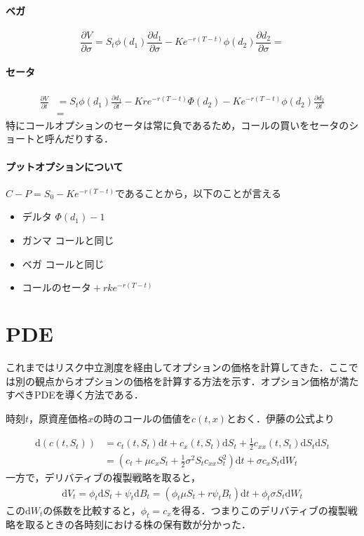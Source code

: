 \documentclass{jsarticle}
\theoremstyle{definition}
\begin{document}
\paragraph{ベガ}
\begin{equation*}
    \frac{\partial V}{\partial \sigma} = S_t\phi(d_1)\frac{\partial d_1}{\partial \sigma} - Ke^{-r(T - t)}\phi(d_2) \frac{\partial d_2}{\partial \sigma} = 
\end{equation*}

\paragraph{セータ}
\begin{align*}
    \frac{\partial V}{\partial t} &= S_t \phi(d_1) \frac{\partial d_1}{\partial t} - Kre^{-r(T-t)}\Phi(d_2) - Ke^{-r(T - t)}\phi(d_2)\frac{\partial d_2}{\partial t}\\
    &= 
\end{align*}
特にコールオプションのセータは常に負であるため，コールの買いをセータのショートと呼んだりする．

\paragraph{プットオプションについて}
$C - P = S_0 - Ke^{-r(T-t)}$であることから，以下のことが言える
\begin{itemize}
    \item デルタ $\Phi(d_1) - 1$
    \item ガンマ コールと同じ
    \item ベガ コールと同じ
    \item $\text{コールのセータ} + rk e^{-r(T - t)}$
\end{itemize}

\section{PDE}
これまではリスク中立測度を経由してオプションの価格を計算してきた．ここでは別の観点からオプションの価格を計算する方法を示す．オプション価格が満たすべきPDEを導く方法である．

時刻$t$，原資産価格$x$の時のコールの価値を$c(t, x)$とおく．伊藤の公式より

\begin{align*}
    \mathrm{d}(c(t, S_t)) &= c_t(t, S_t) \mathrm{d}t + c_x(t, S_t) \mathrm{d}S_t + \frac{1}{2}c_{xx}(t, S_t) \mathrm{d}S_t\mathrm{d}S_t\\
    &= (c_t + \mu c_x S_t + \frac{1}{2}\sigma^2 S_t c_{xx} S_t^2)\mathrm{d}t + \sigma c_x S_t \mathrm{d}W_t
\end{align*}
一方で，デリバティブの複製戦略を取ると，
\begin{align*}
    \mathrm{d}V_t = \phi_t \mathrm{d}S_t + \psi_t \mathrm{d}B_t = (\phi_t \mu S_t + r \psi_t B_t) \mathrm{d}t + \phi_t \sigma S_t \mathrm{d}W_t
\end{align*}
この$\mathrm{d}W_t$の係数を比較すると，$\phi_t = c_x$を得る．つまりこのデリバティブの複製戦略を取るときの各時刻における株の保有数が分かった．
\end{document}
